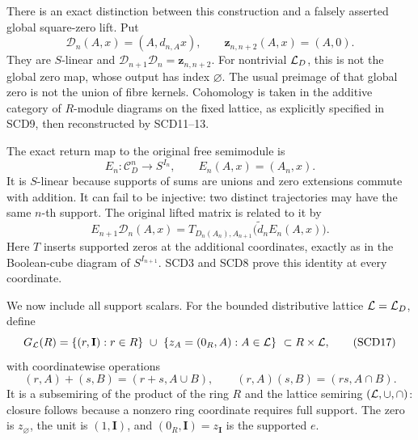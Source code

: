 \documentclass[11pt,a4paper]{article}
\theoremstyle{definition}\newtheorem{definition}[theorem]{Definition}
\begin{document}
There is an exact distinction between this construction and a
falsely asserted global square-zero lift. Put
\[
 \mathcal D_n(A,x)=(A,d_{n,A}x),\qquad
 \mathbf z_{n,n+2}(A,x)=(A,0).
 \tag{SCD14}
\]
They are \(S\)-linear and
\(\mathcal D_{n+1}\mathcal D_n=\mathbf z_{n,n+2}\).
For nontrivial \(\mathcal L_D\), this is not the global zero map,
whose output has index \(\varnothing\). The usual preimage of
that global zero is not the union of fibre kernels.
Cohomology is taken in the additive category of \(R\)-module
diagrams on the fixed lattice, as explicitly specified in SCD9,
then reconstructed by SCD11--13.

The exact return map to the original free semimodule is
\[
 E_n:\mathcal C_D^n\to S^{I_n},\qquad E_n(A,x)=(A_n,x).
 \tag{SCD15}
\]
It is \(S\)-linear because supports of sums are unions and
zero extensions commute with addition. It can fail to be injective:
two distinct trajectories may have the same \(n\)-th support.
The original lifted matrix is related to it by
\[
 E_{n+1}\mathcal D_n(A,x)
 =T_{D_n(A_n),A_{n+1}}\bigl(\widetilde d_n E_n(A,x)\bigr).
 \tag{SCD16}
\]
Here \(T\) inserts supported zeros at the additional coordinates,
exactly as in the Boolean-cube diagram of \(S^{I_{n+1}}\).
SCD3 and SCD8 prove this identity at every coordinate.

We now include all support scalars. For the bounded distributive
lattice \(\mathcal L=\mathcal L_D\), define
\[
 G_{\mathcal L}(R)
 =\{(r,\mathbf I):r\in R\}\ \cup\
   \{z_A=(0_R,A):A\in\mathcal L\}\ \subset R\times\mathcal L,
 \tag{SCD17}
\]
with coordinatewise operations
\[
 (r,A)+(s,B)=(r+s,A\cup B),\qquad
 (r,A)(s,B)=(rs,A\cap B).
\]
It is a subsemiring of the product of the ring \(R\) and the lattice
semiring \((\mathcal L,\cup,\cap)\): closure follows because a nonzero
ring coordinate requires full support. The zero is \(z_\varnothing\),
the unit is \((1,\mathbf I)\), and
\((0_R,\mathbf I)=z_{\mathbf I}\) is the supported \(e\).
\end{document}
